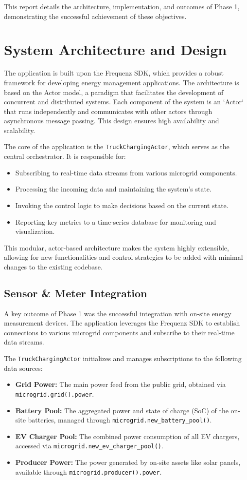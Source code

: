 \documentclass{article}
\begin{document}
This report details the architecture, implementation, and outcomes of Phase 1, demonstrating the successful achievement of these objectives.

\section{System Architecture and Design}
The application is built upon the Frequenz SDK, which provides a robust framework for developing energy management applications. The architecture is based on the Actor model, a paradigm that facilitates the development of concurrent and distributed systems. Each component of the system is an `Actor` that runs independently and communicates with other actors through asynchronous message passing. This design ensures high availability and scalability.

The core of the application is the \texttt{TruckChargingActor}, which serves as the central orchestrator. It is responsible for:
\begin{itemize}
    \item Subscribing to real-time data streams from various microgrid components.
    \item Processing the incoming data and maintaining the system's state.
    \item Invoking the control logic to make decisions based on the current state.
    \item Reporting key metrics to a time-series database for monitoring and visualization.
\end{itemize}

This modular, actor-based architecture makes the system highly extensible, allowing for new functionalities and control strategies to be added with minimal changes to the existing codebase.

\subsection{Sensor \& Meter Integration}
A key outcome of Phase 1 was the successful integration with on-site energy measurement devices. The application leverages the Frequenz SDK to establish connections to various microgrid components and subscribe to their real-time data streams.

The \texttt{TruckChargingActor} initializes and manages subscriptions to the following data sources:
\begin{itemize}
    \item \textbf{Grid Power:} The main power feed from the public grid, obtained via \texttt{microgrid.grid().power}.
    \item \textbf{Battery Pool:} The aggregated power and state of charge (SoC) of the on-site batteries, managed through \texttt{microgrid.new\_battery\_pool()}.
    \item \textbf{EV Charger Pool:} The combined power consumption of all EV chargers, accessed via \texttt{microgrid.new\_ev\_charger\_pool()}.
    \item \textbf{Producer Power:} The power generated by on-site assets like solar panels, available through \texttt{microgrid.producer().power}.
\end{itemize}
\end{document}
